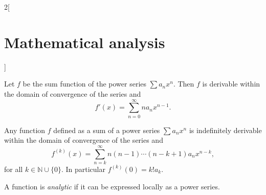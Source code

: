 \documentclass[../../../main.tex]{subfiles}
\begin{document}
\begin{multicols}{2}[\section{Mathematical analysis}]
\begin{corollary}
\end{corollary}
\begin{corollary}
Let $f$ be the sum function of the power series $\sum a_nx^n$. Then $f$ is derivable within the domain of convergence of the series and $$f'(x)=\sum_{n=0}^\infty na_nx^{n-1}.$$
\end{corollary}
\begin{corollary}
Any function $f$ defined as a sum of a power series $\sum a_nx^n$ is indefinitely derivable within the domain of convergence of the series and $$f^{(k)}(x)=\sum_{n=k}^\infty n(n-1)\cdots(n-k+1)a_nx^{n-k},$$
for all $k\in\mathbb{N}\cup\{0\}$. In particular $f^{(k)}(0)=k!a_k$.
\end{corollary}
\begin{definition}
A function is \textit{analytic} if it can be expressed locally as a power series.
\end{definition}

\end{multicols}
\end{document}
